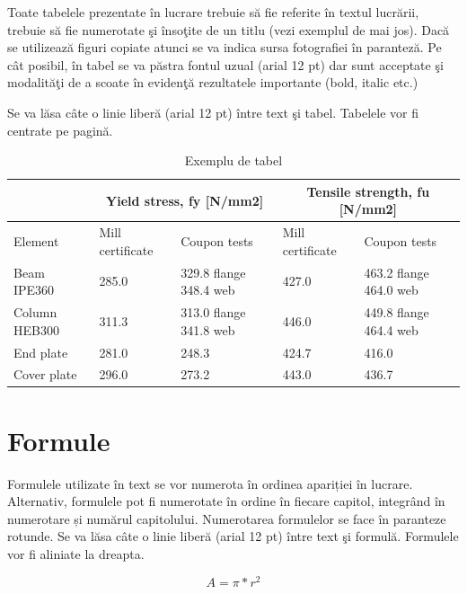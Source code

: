 Toate tabelele prezentate în lucrare trebuie să fie referite în textul lucrării, trebuie să fie numerotate şi însoţite de un titlu (vezi exemplul de mai jos). Dacă se utilizează figuri copiate atunci se va indica sursa fotografiei în paranteză. Pe cât posibil, în tabel se va păstra fontul uzual (arial 12 pt) dar sunt acceptate şi modalităţi de a scoate în evidenţă rezultatele importante (bold, italic etc.)

Se va lăsa câte o linie liberă (arial 12 pt) între text şi tabel. Tabelele vor fi centrate pe pagină.

\begin{table}[ht]
\centering
\caption{Exemplu de tabel}
\label{table:table1}
\begin{tabular}{ |p{2.9cm}|p{2.45cm}|p{4cm}|p{2.45cm}|p{4cm}|  }
 \hline
  &  \multicolumn{2}{|c|}{Yield stress, fy [N/mm2]} & \multicolumn{2}{|c|}{Tensile strength, fu [N/mm2]} \\
 \hline
 Element & Mill certificate & Coupon tests & Mill certificate & Coupon tests \\
 \hline
 Beam IPE360 & 285.0 & 329.8 flange 348.4 web & 427.0 & 463.2 flange 464.0 web \\
 \hline
 Column HEB300 & 311.3 & 313.0 flange 341.8 web	& 446.0	& 449.8 flange 464.4 web \\
 \hline
 End plate & 281.0 & 248.3 & 424.7 & 416.0 \\
 \hline
 Cover plate & 296.0 & 273.2 & 443.0 & 436.7 \\
 \hline
\end{tabular}
\end{table}

\section{Formule}

Formulele utilizate în text se vor numerota în ordinea apariției în lucrare. Alternativ, formulele pot fi numerotate în ordine în fiecare capitol, integrând în numerotare și numărul capitolului. Numerotarea formulelor se face în paranteze rotunde. Se va lăsa câte o linie liberă (arial 12 pt) între text şi formulă. Formulele vor fi aliniate la dreapta.

\begin{equation}
A=\pi*r^2
\end{equation}